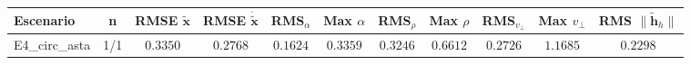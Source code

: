 \begin{tabular}{lcccccccccc}
\toprule
Escenario & n & RMSE $\tilde{\mathbf{x}}$ & RMSE $\dot{\tilde{\mathbf{x}}}$ & RMS$_\alpha$ & Max $\alpha$ & RMS$_\rho$ & Max $\rho$ & RMS$_{v_\perp}$ & Max $v_\perp$ & RMS $\|\tilde{\mathbf{h}}_h\|$ \\
\midrule
E4\_circ\_asta & 1/1 & $0.3350$ & $0.2768$ & $0.1624$ & $0.3359$ & $0.3246$ & $0.6612$ & $0.2726$ & $1.1685$ & $0.2298$ \\
\bottomrule
\end{tabular}

